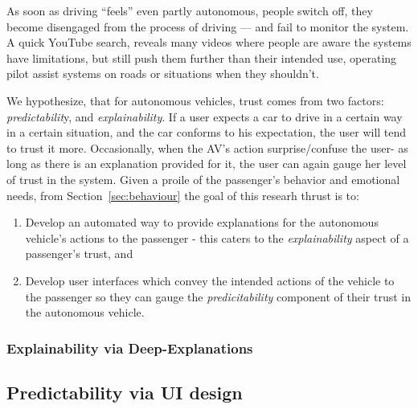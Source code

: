 As soon as driving ``feels'' even partly autonomous, people switch off, they become disengaged from the process of driving — and fail to monitor the system. 
A quick YouTube search, reveals many videos where people are aware the systems have limitations, but still push them further than their intended use, operating pilot assist systems on roads or situations when they shouldn't.

We hypothesize, that for autonomous vehicles, trust comes from two factors: \textit{predictabilit}y, and \textit{explainability}.
If a user expects a car to drive in a certain way in a certain situation, and the car conforms to his expectation, the user will tend to trust it more.
Occasionally, when the AV’s action surprise/confuse the user- as long as there is an explanation provided for it, the user can again gauge her level of trust in the system.
Given a proile of the passenger's behavior and emotional needs, from Section~\ref{sec:behaviour} the goal of this researh thrust is to:
\begin{enumerate}[itemsep=0pt,parsep=0pt,topsep=4pt,leftmargin=0.4in]
    \item Develop an automated way to provide explanations for the autonomous vehicle's actions to the passenger - this caters to the \textit{explainability} aspect of a passenger's trust, and
    \item Develop user interfaces which convey the intended actions of the vehicle to the passenger so they can gauge the \textit{predicitability} component of their trust in the autonomous vehicle.
\end{enumerate}

% 



\subsubsection{Explainability via Deep-Explanations }
\label{subsec:explainability}


\subsection{Predictability via UI design}
\label{subsec:uid}
